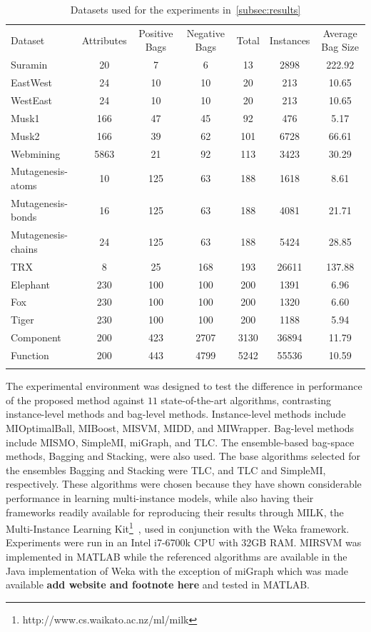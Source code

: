 \documentclass[preprint,12pt]{elsarticle}
\begin{document}
\begin{table}[t!]
\caption{Datasets used for the experiments in~\ref{subsec:results}}
\small
\label{tab:Dataset}
\begin{tabularx}{\textwidth}{l@{\extracolsep{\fill}}cccccc}
\hline\noalign{\smallskip}
Dataset & Attributes & Positive Bags & Negative Bags & Total & Instances & Average Bag Size\\
\noalign{\smallskip}\hline\noalign{\smallskip}
Suramin & 20 & 7 & 6 & 13 & 2898 &  222.92 \\ 
EastWest & 24 & 10 & 10 & 20 & 213 &  10.65  \\ 
WestEast & 24 & 10 & 10 & 20 & 213 &  10.65  \\ 
Musk1 & 166 & 47 & 45 & 92 & 476 &  5.17  \\ 
Musk2 & 166 & 39 & 62 & 101 & 6728 &  66.61  \\ 
Webmining & 5863 & 21 & 92 & 113 & 3423 &  30.29  \\ 
Mutagenesis-atoms & 10 & 125 & 63 & 188 & 1618 &  8.61  \\ 
Mutagenesis-bonds & 16 & 125 & 63 & 188 & 4081 &  21.71  \\ 
Mutagenesis-chains & 24 & 125 & 63 & 188 & 5424 &  28.85  \\ 
TRX & 8 & 25 & 168 & 193 & 26611 &  137.88 \\ 
Elephant & 230 & 100 & 100 & 200 & 1391 &  6.96 \\ 
Fox & 230 & 100 & 100 & 200 & 1320 &  6.60 \\ 
Tiger & 230 & 100 & 100 & 200 & 1188 &  5.94  \\ 
Component & 200 & 423 & 2707 & 3130 & 36894 &  11.79  \\ 
Function & 200 & 443 & 4799 & 5242 & 55536 &  10.59  \\ 
\noalign{\smallskip}\hline
\end{tabularx}
\end{table}

The experimental environment was designed to test the difference in performance of the proposed method against $11$ state-of-the-art algorithms, contrasting instance-level methods and bag-level methods. Instance-level methods include MIOptimalBall, MIBoost, MISVM, MIDD, and MIWrapper. Bag-level methods include MISMO, SimpleMI, miGraph, and TLC. The ensemble-based bag-space methods, Bagging and Stacking, were also used. The base algorithms selected for the ensembles Bagging and Stacking were TLC, and TLC and SimpleMI, respectively. These algorithms were chosen because they have shown considerable performance in learning multi-instance models, while also having their frameworks readily available for reproducing their results through MILK, the Multi-Instance Learning Kit\footnote{http://www.cs.waikato.ac.nz/ml/milk}~\citep{Xu2003}, used in conjunction with the Weka framework. Experiments were run in an Intel i7-6700k CPU with 32GB RAM. MIRSVM was implemented in MATLAB while the referenced algorithms are available in the Java implementation of Weka with the exception of miGraph which was made available \textbf{add website and footnote here} and tested in MATLAB.
\end{document}
